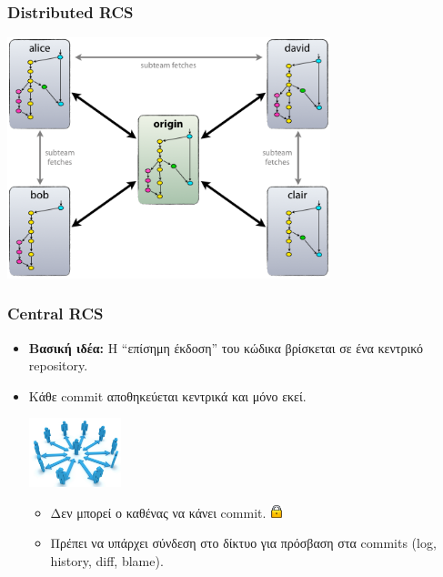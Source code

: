 \documentclass[handout]{beamer}
\begin{document}
\begin{frame}
  \frametitle{Distributed RCS}
  \begin{center}
    \includegraphics[height=7cm]{centr-decentr.png}
  \end{center}
\end{frame}

\begin{frame}
  \frametitle{Central RCS}
  \begin{itemize}
    \item \textbf{Βασική ιδέα:} Η ``επίσημη έκδοση'' του κώδικα βρίσκεται σε ένα
      κεντρικό repository.
    \item Κάθε commit αποθηκεύεται κεντρικά και μόνο εκεί.
      \begin{center}
        \includegraphics[height=2cm]{social_network.jpg} \hspace{0.5em}
      \end{center}\pause
      \begin{itemize}
      \item Δεν μπορεί ο καθένας να κάνει commit.
        \includegraphics[width=1em]{Lock1.png} \pause
      \item Πρέπει να υπάρχει σύνδεση στο δίκτυο για πρόσβαση στα commits (log,
        history, diff, blame).
      \end{itemize}
  \end{itemize}
\end{frame}
\end{document}
